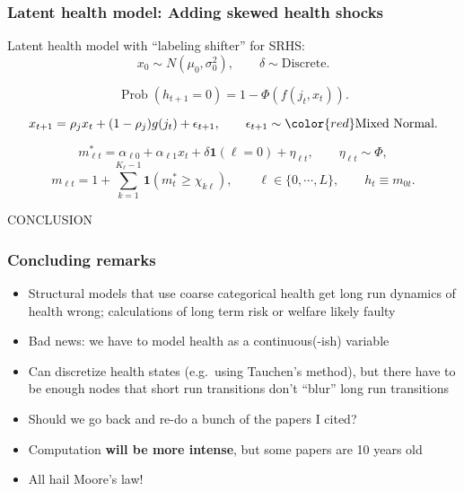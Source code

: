 \documentclass[aspectratio=169]{beamer}
\newcommand{\Prob}{\operatorname{Prob}}
\begin{document}
\begin{frame}\frametitle{Latent health model: Adding skewed health shocks}
Latent health model with ``labeling shifter'' for SRHS:
\setcounter{equation}{0}
\begin{equation}
x_0 \sim N(\mu_0, \sigma^2_0), \qquad \delta \sim \text{Discrete}.
\end{equation}

\begin{equation}
\Prob(h_{t+1} = 0) = 1 - \Phi(f(j_t,x_t)).
\end{equation}

\begin{equation}
x_{t+1} = \rho_{j} x_t + (1-\rho_j)g(j_t) + \epsilon_{t+1}, \qquad \epsilon_{t+1} \sim {\color{red} \text{Mixed Normal}}.
\end{equation}

\begin{equation}
m^*_{\ell t} = \alpha_{\ell 0} + \alpha_{\ell 1} x_t  + \delta \mathbf{1}(\ell=0) + \eta_{\ell t}, \qquad \eta_{\ell t} \sim \Phi,
\end{equation}
\begin{equation*}
m_{\ell t} = 1 + \sum_{k = 1}^{K_{\ell}-1} \mathbf{1}(m^*_t \geq \chi_{k\ell}), \qquad \ell \in \{0,\cdots,L\}, \qquad h_t \equiv m_{0t}.
\end{equation*}
\end{frame}


\appendix


\begin{frame}
\begin{center}
	\Huge
	CONCLUSION
\end{center}
\end{frame}


\begin{frame}\frametitle{Concluding remarks}
\begin{itemize}
	\item <1->Structural models that use coarse categorical health get long run dynamics of health wrong; calculations of long term risk or welfare likely faulty
	
	\item <2->Bad news: we have to model health as a continuous(-ish) variable
	
	\item <2->Can discretize health states (e.g.\ using Tauchen's method), but there have to be enough nodes that short run transitions don't ``blur'' long run transitions
	
	\item <3->Should we go back and re-do a bunch of the papers I cited?
	
	\item <3->Computation \textbf{will be more intense}, but some papers are 10 years old
	
	\item <4->All hail Moore's law!
\end{itemize}	
\end{frame}
\end{document}
